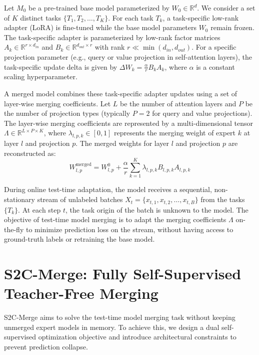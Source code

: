 \documentclass{article}
\theoremstyle{plain}
\theoremstyle{definition}
\theoremstyle{remark}
\begin{document}
Let $M_0$ be a pre-trained base model parameterized by $W_0 \in \mathbb{R}^d$. We consider a set of $K$ distinct tasks $\{T_1, T_2, \dots, T_K\}$. For each task $T_k$, a task-specific low-rank adapter (LoRA) \cite{hu2021lora} is fine-tuned while the base model parameters $W_0$ remain frozen. The task-specific adapter is parameterized by low-rank factor matrices $A_k \in \mathbb{R}^{r \times d_{in}}$ and $B_k \in \mathbb{R}^{d_{out} \times r}$ with rank $r \ll \min(d_{in}, d_{out})$. For a specific projection parameter (e.g., query or value projection in self-attention layers), the task-specific update delta is given by $\Delta W_k = \frac{\alpha}{r} B_k A_k$, where $\alpha$ is a constant scaling hyperparameter.

A merged model combines these task-specific adapter updates using a set of layer-wise merging coefficients. Let $L$ be the number of attention layers and $P$ be the number of projection types (typically $P=2$ for query and value projections). The layer-wise merging coefficients are represented by a multi-dimensional tensor $\Lambda \in \mathbb{R}^{L \times P \times K}$, where $\lambda_{l, p, k} \in [0, 1]$ represents the merging weight of expert $k$ at layer $l$ and projection $p$. The merged weights for layer $l$ and projection $p$ are reconstructed as:
\begin{equation}
    W^{\text{merged}}_{l, p} = W^0_{l, p} + \frac{\alpha}{r} \sum_{k=1}^K \lambda_{l, p, k} B_{l, p, k} A_{l, p, k}
\end{equation}

During online test-time adaptation, the model receives a sequential, non-stationary stream of unlabeled batches $X_t = \{x_{t,1}, x_{t,2}, \dots, x_{t,B}\}$ from the tasks $\{T_k\}$. At each step $t$, the task origin of the batch is unknown to the model. The objective of test-time model merging is to adapt the merging coefficients $\Lambda$ on-the-fly to minimize prediction loss on the stream, without having access to ground-truth labels or retraining the base model.

\section{S2C-Merge: Fully Self-Supervised Teacher-Free Merging}
\label{sec:method}

S2C-Merge aims to solve the test-time model merging task without keeping unmerged expert models in memory. To achieve this, we design a dual self-supervised optimization objective and introduce architectural constraints to prevent prediction collapse.
\end{document}
